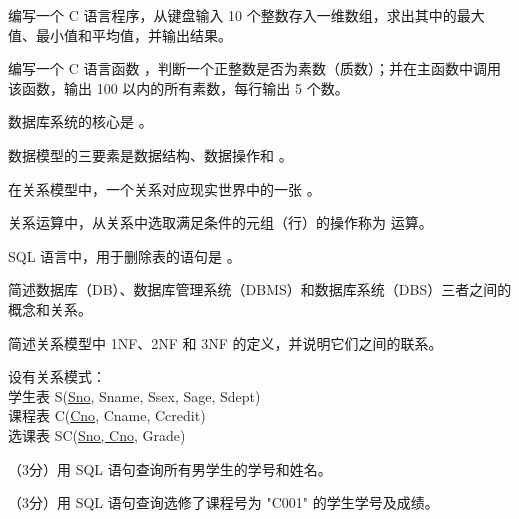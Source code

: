 \documentclass[a4paper,11pt]{article}
\begin{document}

\pq 编写一个 C 语言程序，从键盘输入 10 个整数存入一维数组，求出其中的最大值、最小值和平均值，并输出结果。


\anslines{5cm}

\pq 编写一个 C 语言函数 ，判断一个正整数是否为素数（质数）；并在主函数中调用该函数，输出 100 以内的所有素数，每行输出 5 个数。


\anslines{5cm}



\q 数据库系统的核心是 \fillblank 。

\q 数据模型的三要素是数据结构、数据操作和 \fillblank 。

\q 在关系模型中，一个关系对应现实世界中的一张 \fillblank 。

\q 关系运算中，从关系中选取满足条件的元组（行）的操作称为 \fillblank 运算。

\q SQL 语言中，用于删除表的语句是 \fillblank 。


\q 简述数据库（DB）、数据库管理系统（DBMS）和数据库系统（DBS）三者之间的概念和关系。
\anslines{3cm}

\q 简述关系模型中 1NF、2NF 和 3NF 的定义，并说明它们之间的联系。
\anslines{3cm}


设有关系模式：\\
学生表 S(\underline{Sno}, Sname, Ssex, Sage, Sdept)\\
课程表 C(\underline{Cno}, Cname, Ccredit)\\
选课表 SC(\underline{Sno, Cno}, Grade)

\q （3分）用 SQL 语句查询所有男学生的学号和姓名。

\anslines{1cm}

\q （3分）用 SQL 语句查询选修了课程号为 "C001" 的学生学号及成绩。

\anslines{1cm}
\end{document}
